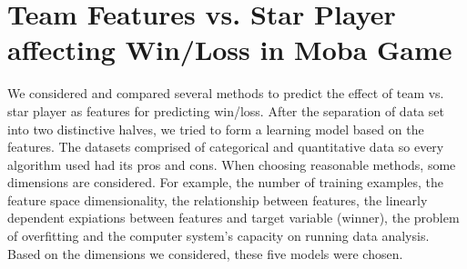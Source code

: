 \documentclass[conference]{IEEEtran}
\begin{document}
\section{Team Features vs. Star Player affecting Win/Loss in Moba Game}


We considered and compared several methods to predict the effect of team vs. star player as features for predicting win/loss. 
After the separation of data set into two distinctive halves, we tried to form a learning model based on the features. The datasets comprised of categorical and quantitative data so every algorithm used had its pros and cons. When choosing reasonable methods, some dimensions are considered. For example, the number of training examples, the feature space dimensionality, the relationship between features, the linearly dependent expiations between features and target variable (winner), the problem of overfitting and the computer system’s capacity on running data analysis. Based on the dimensions we considered, these five models were chosen.
\end{document}

